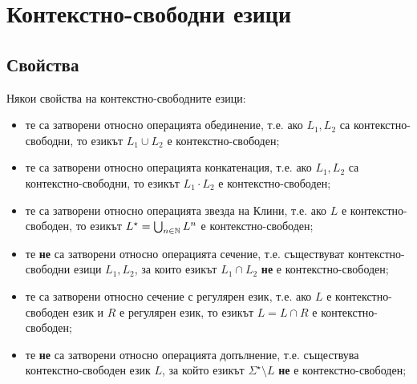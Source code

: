 
\chapter{Контекстно-свободни езици}

\section{Свойства}

Някои свойства на контекстно-свободните езици:
\begin{itemize}
\item 
  те са затворени относно операцията обединение, т.е.
  ако $L_1, L_2$ са контекстно-свободни, то езикът $L_1 \cup L_2$ е контекстно-свободен; 
\item
  те са затворени относно операцията конкатенация, т.е.
  ако $L_1, L_2$ са контекстно-свободни, то езикът $L_1 \cdot L_2$ е контекстно-свободен; 
\item
  те са затворени относно операцията звезда на Клини, т.е.
  ако $L$ е контекстно-свободен, то езикът $L^\star = \bigcup_{n\in\mathbb{N}} L^n$ е контекстно-свободен; 
\item
  те {\bf не} са затворени относно операцията сечение, т.е.
  съществуват контекстно-свободни езици $L_1, L_2$, за които езикът $L_1 \cap L_2$ {\bf не} е контекстно-свободен; 
\item
  те са затворени относно сечение с регулярен език, т.е.
  ако $L$ е контекстно-свободен език и $R$ е регулярен език, то езикът $L = L \cap R$ е контекстно-свободен; 
\item
  те {\bf не} са затворени относно операцията допълнение, т.е.
  съществува контекстно-свободен език $L$, за който езикът $\Sigma^\star\setminus L$ {\bf не} е контекстно-свободен; 
\end{itemize}

